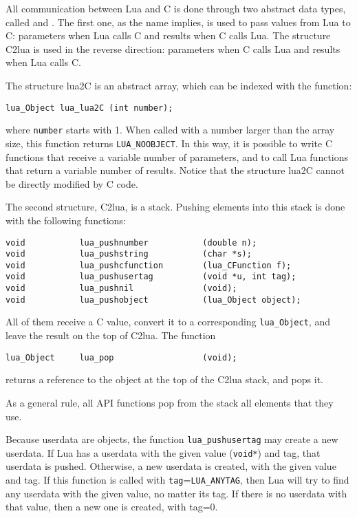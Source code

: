 All communication between Lua and C is done through two
abstract data types, called  and .
The first one, as the name implies, is used to pass values
from Lua to C: parameters when Lua calls C and results when C calls Lua.
The structure C2lua is used in the reverse direction:
parameters when C calls Lua and results when Lua calls C.

The structure lua2C is an abstract array,
which can be indexed with the function:
\begin{verbatim}
lua_Object lua_lua2C (int number);
\end{verbatim}
where \verb|number| starts with 1.
When called with a number larger than the array size,
this function returns \verb|LUA_NOOBJECT|.
In this way, it is possible to write C functions that receive
a variable number of parameters,
and to call Lua functions that return a variable number of results.
Notice that the structure lua2C cannot be directly modified by C code.

The second structure, C2lua, is a stack.
Pushing elements into this stack
is done with the following functions:
\label{pushing}
\begin{verbatim}
void           lua_pushnumber           (double n);
void           lua_pushstring           (char *s);
void           lua_pushcfunction        (lua_CFunction f);
void           lua_pushusertag          (void *u, int tag);
void           lua_pushnil              (void);
void           lua_pushobject           (lua_Object object);
\end{verbatim}
All of them receive a C value,
convert it to a corresponding \verb|lua_Object|,
and leave the result on the top of C2lua.
The function
\begin{verbatim}
lua_Object     lua_pop                  (void);
\end{verbatim}
returns a reference to the object at the top of the C2lua stack,
and pops it.

As a general rule, all API functions pop from the stack
all elements that they use.

Because userdata are objects,
the function \verb|lua_pushusertag| may create a new userdata.
If Lua has a userdata with the given value (\verb|void*|) and tag,
that userdata is pushed.
Otherwise, a new userdata is created, with the given value and tag.
If this function is called with
\verb|tag|=\verb|LUA_ANYTAG|,
then Lua will try to find any userdata with the given value,
no matter its tag.
If there is no userdata with that value, then a new one is created,
with tag=0.

